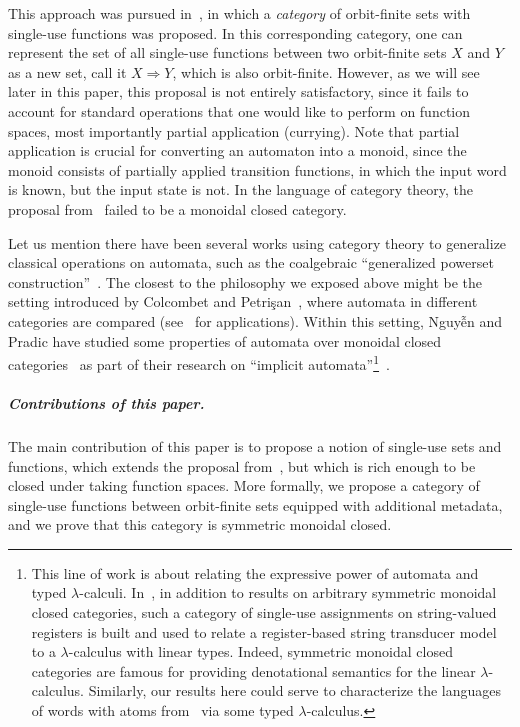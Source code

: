 This approach was pursued in~\cite{stefanski-phd}, in which a \emph{category} of orbit-finite sets with single-use functions was proposed. In this corresponding category,  one can represent the set of all single-use functions between two orbit-finite sets $X$ and $Y$ as a new set, call it $X \Rightarrow Y$, which is  also orbit-finite.  However, as we will see later in this paper, this proposal is not entirely satisfactory, since it fails to account for standard operations that one would like to perform on function spaces, most importantly partial application (currying). Note that partial application is crucial for converting an automaton into a monoid, since the monoid consists of partially applied transition functions, in which the input word is known, but the input state is not. In the language of category theory, the proposal from~\cite{stefanski-phd} failed to be a monoidal closed category.

Let us mention there have been several works using category theory to generalize classical operations on automata, such as the coalgebraic ``generalized powerset construction''~\cite{DBLP:journals/corr/abs-1302-1046}. The closest to the philosophy we exposed above might be the setting introduced by Colcombet and Petrişan~\cite{colcombet2020automata}, where automata in different categories are compared (see~\cite{ColcombetPS21,Aristote24} for applications). Within this setting, Nguy{\~{ê}}n and Pradic have studied some properties of automata over monoidal closed categories~\cite[Sections~1.2.3~and~4.7--4.8]{titoPhD} as part of their research on ``implicit automata''\footnote{\label{ftn:iatlc}This line of work is about relating the expressive power of automata and typed $\lambda$-calculi. In~\cite{IATLC2,titoPhD}, in addition to results on arbitrary symmetric monoidal closed categories, such a category of single-use assignments on string-valued registers is built and used to relate a register-based string transducer model to a $\lambda$-calculus with linear types. Indeed, symmetric monoidal closed categories are famous for providing denotational semantics for the linear $\lambda$-calculus. Similarly, our results here could serve to characterize the languages of words with atoms from~\cite{bojanczykstefanski2020} via some typed $\lambda$-calculus.}~\cite{IATLC,IATLC2,titoPhD,pradic2024implicit}.

 \subparagraph{Contributions of this paper.}
 The main contribution of this paper is to propose a notion of single-use sets and functions, which extends the proposal from~\cite{stefanski-phd}, but which is rich enough to be closed under taking function spaces. More formally, we propose a category of single-use functions between orbit-finite sets equipped with additional metadata, and we prove that this category is symmetric monoidal closed.

